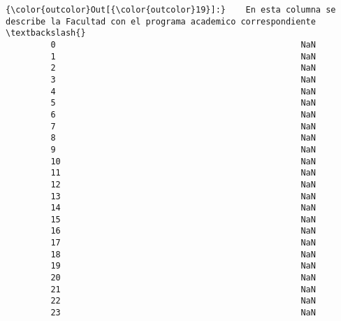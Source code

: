 \documentclass[11pt]{article}
\begin{document}
\begin{Verbatim}[commandchars=\\\{\}]
{\color{outcolor}Out[{\color{outcolor}19}]:}    En esta columna se describe la Facultad con el programa academico correspondiente   \textbackslash{}
         0                                                 NaN                                   
         1                                                 NaN                                   
         2                                                 NaN                                   
         3                                                 NaN                                   
         4                                                 NaN                                   
         5                                                 NaN                                   
         6                                                 NaN                                   
         7                                                 NaN                                   
         8                                                 NaN                                   
         9                                                 NaN                                   
         10                                                NaN                                   
         11                                                NaN                                   
         12                                                NaN                                   
         13                                                NaN                                   
         14                                                NaN                                   
         15                                                NaN                                   
         16                                                NaN                                   
         17                                                NaN                                   
         18                                                NaN                                   
         19                                                NaN                                   
         20                                                NaN                                   
         21                                                NaN                                   
         22                                                NaN                                   
         23                                                NaN                                   

\end{Verbatim}
\end{document}

